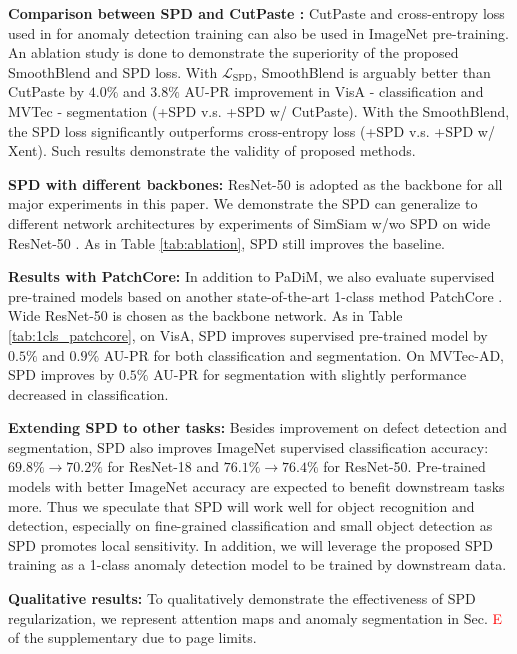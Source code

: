 \noindent\textbf{Comparison between SPD and CutPaste \cite{li2021cutpaste}:} CutPaste and cross-entropy loss used in \cite{li2021cutpaste} for anomaly detection training can also be used in ImageNet pre-training. An ablation study is done to demonstrate the superiority of the proposed SmoothBlend and SPD loss. With $\mathcal{L}_{\mathrm{SPD}}$, SmoothBlend is arguably better than CutPaste by $4.0\%$ and $3.8\%$ AU-PR improvement in VisA - classification and MVTec - segmentation (+SPD v.s. +SPD w/ CutPaste). With the SmoothBlend, the SPD loss significantly outperforms cross-entropy loss (+SPD v.s. +SPD w/ Xent). Such results demonstrate the validity of proposed methods.

\noindent\textbf{SPD with different backbones:} ResNet-50 is adopted as the backbone for all major experiments in this paper. We demonstrate the SPD can generalize to different network architectures by experiments of SimSiam w/wo SPD on wide ResNet-50 \cite{zagoruyko2016wide}. As in Table \ref{tab:ablation}, SPD still improves the baseline.

\noindent\textbf{Results with PatchCore: }
In addition to PaDiM, we also evaluate supervised pre-trained models based on another state-of-the-art 1-class method PatchCore \cite{Roth_2022_CVPR}. Wide ResNet-50 is chosen as the backbone network. As in Table \ref{tab:1cls_patchcore}, on VisA, SPD improves supervised pre-trained model by $0.5\%$ and $0.9\%$ AU-PR for both classification and segmentation. On MVTec-AD, SPD improves by $0.5\%$ AU-PR for segmentation with slightly performance decreased in classification.

\noindent\textbf{Extending SPD to other tasks:} Besides improvement on defect detection and segmentation, SPD also improves ImageNet supervised classification accuracy:  $69.8\%\rightarrow70.2\%$ for ResNet-18 and $76.1\%\rightarrow76.4\%$ for ResNet-50.
Pre-trained models with better ImageNet accuracy are expected to benefit downstream tasks more. Thus we speculate that SPD will work well for object recognition and detection, especially on fine-grained classification and small object detection as SPD promotes local sensitivity. In addition, we will leverage the proposed SPD training as a 1-class anomaly detection model to be trained by downstream data.

\noindent\textbf{Qualitative results:} To qualitatively demonstrate the effectiveness of SPD regularization, we represent attention maps and anomaly segmentation in Sec. \textcolor{red}{E} of the supplementary due to page limits.

